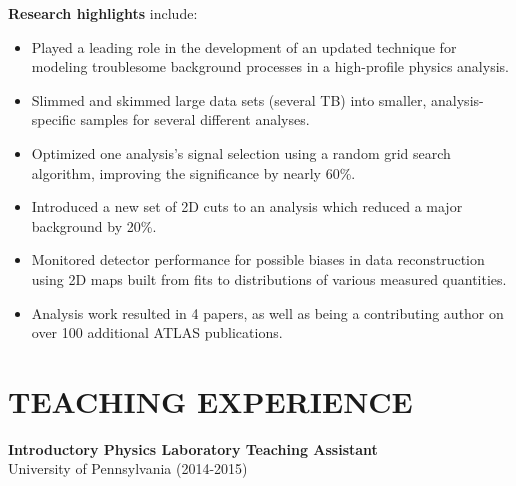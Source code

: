 \documentclass[10pt]{res}
\begin{document}
\begin{resume}

    {\bf Research highlights} include:
    \begin{itemize}
    \item Played a leading role in the development of an updated technique for modeling troublesome background processes in a high-profile physics analysis.
    \item Slimmed and skimmed large data sets (several TB) into smaller, analysis-specific samples for several different analyses.
    \item Optimized one analysis's signal selection using a random grid search algorithm, improving the significance by nearly 60\%.
    \item Introduced a new set of 2D cuts to an analysis which reduced a major background by 20\%.
    \item Monitored detector performance for possible biases in data reconstruction using 2D maps built from fits to distributions of various measured quantities.
    \item Analysis work resulted in 4 papers, as well as being a contributing author on over 100 additional ATLAS publications.
    \end{itemize}

\section{TEACHING EXPERIENCE}%
    {\bf Introductory Physics Laboratory Teaching Assistant}\\
    University of Pennsylvania (2014-2015)


\end{resume}
\end{document}
